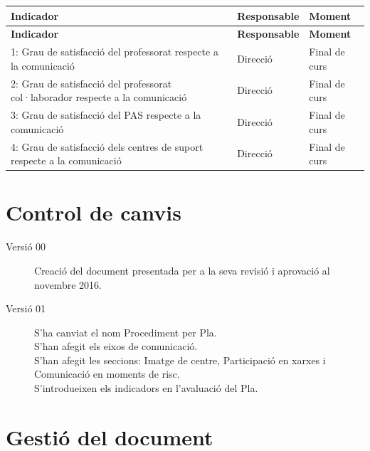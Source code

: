 \documentclass[fontsize=10pt,%
paper=a4,%
DIV=14,%
twoside=semi,%
pagesize=auto,%
parskip=half,
captions=tableheading,%
numbers=noenddot,%
toc=graduated%
]{scrartcl}
\renewcommand{\arraystretch}{1.75}%
\renewcommand{\arraystretch}{1.75}%
\begin{document}
\small{
\setlength{\tabcolsep}{10pt}
\renewcommand{\arraystretch}{1.5}
\begin{longtable}{p{10.5cm}p{1.7cm}p{1.7cm}}
\hline
\textbf{Indicador}                                                             & \textbf{Responsable} & \textbf{Moment} \\
\hline \endfirsthead
\hline
\textbf{Indicador}                                                             & \textbf{Responsable} & \textbf{Moment} \\
\hline \endhead
1: Grau de satisfacció del professorat respecte a la comunicació               & Direcció             & Final de curs   \\
2: Grau de satisfacció del professorat col·laborador respecte a la comunicació & Direcció             & Final de curs   \\
3: Grau de satisfacció del PAS respecte a la comunicació                       & Direcció             & Final de curs   \\
4: Grau de satisfacció dels centres de suport respecte a la comunicació        & Direcció             & Final de curs   \\
\end{longtable}
}%




\section{Control de canvis}\label{sec:ctrlcanvis}

\begin{description}
\item[Versió 00] Creació del document presentada per a la seva revisió i aprovació al novembre 2016.
\item[Versió 01] S'ha canviat el nom Procediment per Pla.\\ S'han afegit els eixos de comunicació.\\ S'han afegit les seccions: Imatge de centre, Participació en xarxes i Comunicació en moments de risc.\\ S'introdueixen els indicadors en l'avaluació del Pla.
\end{description}





\section{Gestió del document}\label{sec:gestiodoc}
\end{document}
